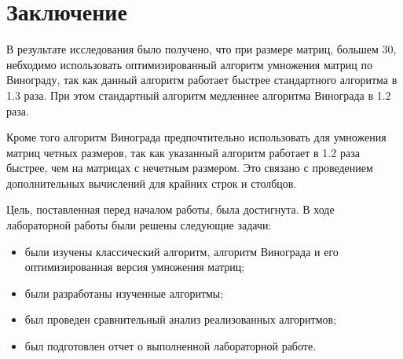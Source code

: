 \chapter*{Заключение}

В результате исследования было получено, что при размере матриц, большем 30, небходимо использовать оптимизированный алгоритм умножения матриц по Винограду, так как данный алгоритм работает быстрее стандартного алгоритма в 1.3 раза. При этом стандартный алгоритм медленнее алгоритма Винограда в 1.2 раза.

Кроме того алгоритм Винограда предпочтительно использовать для умножения матриц четных размеров, так как указанный алгоритм работает в 1.2 раза быстрее, чем на матрицах с нечетным размером. Это связано с проведением дополнительных вычислений для крайних строк и столбцов.

Цель, поставленная перед началом работы, была достигнута. В ходе лабораторной работы были решены следующие задачи:

\begin{itemize}
	\item были изучены классический алгоритм, алгоритм Винограда и его оптимизированная версия умножения матриц;
	\item были разработаны изученные алгоритмы;
	\item был проведен сравнительный анализ реализованных алгоритмов;
	\item был подготовлен отчет о выполненной лабораторной работе.
\end{itemize}
